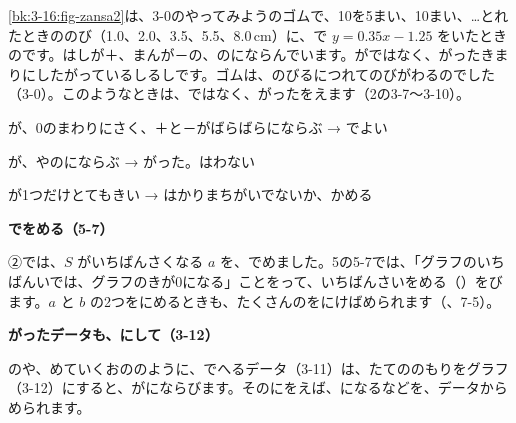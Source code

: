 \ref{bk:3-16:fig-zansa2}は、3-0のやってみようのゴムで、10を5まい、10まい、…とれたときののび（1.0、2.0、3.5、5.5、8.0\,cm）に、で $y=0.35x-1.25$ をいたときのです。はしが＋、まんが－の、のにならんでいます。がではなく、がったきまりにしたがっているしるしです。ゴムは、のびるにつれてのびがわるのでした（3-0）。このようなときは、ではなく、がったをえます（2の3-7〜3-10）。

\begin{taisetsu}
が、0のまわりにさく、＋と－がばらばらにならぶ → でよい\par
{}が、やのにならぶ → がった。はわない\par
{}が1つだけとてもきい → はかりまちがいでないか、かめる
\end{taisetsu}

\begin{motto}[3]
\textbf{でをめる（5-7）}\par
②では、$S$ がいちばんさくなる $a$ を、でめました。5の5-7では、「グラフのいちばんいでは、グラフのきが0になる」ことをって、いちばんさいをめる（）をびます。$a$ と $b$ の2つをにめるときも、たくさんのをにけばめられます（、7-5）。\par\vspace{4pt}
\textbf{がったデータも、にして（3-12）}\par
{}のや、めていくおののように、でへるデータ（3-11）は、たてののもりをグラフ（3-12）にすると、がにならびます。そのにをえば、になるなどを、データからめられます。
\end{motto}

